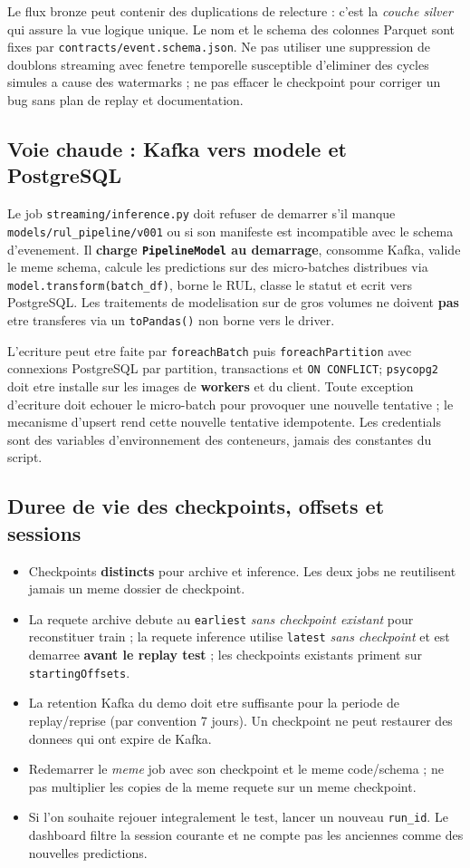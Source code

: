 \documentclass[10pt,a4paper]{article}
\newcommand{\code}[1]{{\small\ttfamily\nolinkurl{#1}}}
\begin{document}
Le flux bronze peut contenir des duplications de relecture : c'est la \emph{couche silver} qui assure la vue logique unique. Le nom et le schema des colonnes Parquet sont fixes par \code{contracts/event.schema.json}. Ne pas utiliser une suppression de doublons streaming avec fenetre temporelle susceptible d'eliminer des cycles simules a cause des watermarks ; ne pas effacer le checkpoint pour corriger un bug sans plan de replay et documentation.

\subsection{Voie chaude : Kafka vers modele et PostgreSQL}
Le job \code{streaming/inference.py} doit refuser de demarrer s'il manque \code{models/rul_pipeline/v001} ou si son manifeste est incompatible avec le schema d'evenement. Il \textbf{charge \code{PipelineModel} au demarrage}, consomme Kafka, valide le meme schema, calcule les predictions sur des micro-batches distribues via \code{model.transform(batch_df)}, borne le RUL, classe le statut et ecrit vers PostgreSQL. Les traitements de modelisation sur de gros volumes ne doivent \textbf{pas} etre transferes via un \code{toPandas()} non borne vers le driver.

L'ecriture peut etre faite par \code{foreachBatch} puis \code{foreachPartition} avec connexions PostgreSQL par partition, transactions et \code{ON CONFLICT}; \code{psycopg2} doit etre installe sur les images de \textbf{workers} et du client. Toute exception d'ecriture doit echouer le micro-batch pour provoquer une nouvelle tentative ; le mecanisme d'upsert rend cette nouvelle tentative idempotente. Les credentials sont des variables d'environnement des conteneurs, jamais des constantes du script.

\subsection{Duree de vie des checkpoints, offsets et sessions}
\begin{itemize}
\item Checkpoints \textbf{distincts} pour archive et inference. Les deux jobs ne reutilisent jamais un meme dossier de checkpoint.
\item La requete archive debute au \code{earliest} \emph{sans checkpoint existant} pour reconstituer train ; la requete inference utilise \code{latest} \emph{sans checkpoint} et est demarree \textbf{avant le replay test} ; les checkpoints existants priment sur \code{startingOffsets}.
\item La retention Kafka du demo doit etre suffisante pour la periode de replay/reprise (par convention 7 jours). Un checkpoint ne peut restaurer des donnees qui ont expire de Kafka.
\item Redemarrer le \emph{meme} job avec son checkpoint et le meme code/schema ; ne pas multiplier les copies de la meme requete sur un meme checkpoint.
\item Si l'on souhaite rejouer integralement le test, lancer un nouveau \code{run_id}. Le dashboard filtre la session courante et ne compte pas les anciennes comme des nouvelles predictions.
\end{itemize}
\end{document}
